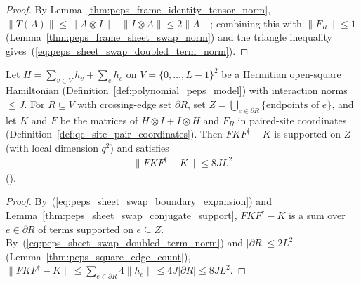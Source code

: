 \begin{proof}\leanok
    By Lemma~\ref{thm:peps_frame_identity_tensor_norm},
    $\|T(A)\|\le\|A\otimes I\|+\|I\otimes A\|\le 2\|A\|$; combining this with
    $\|F_R\|\le 1$ (Lemma~\ref{thm:peps_frame_sheet_swap_norm}) and the
    triangle inequality gives~(\ref{eq:peps_sheet_swap_doubled_term_norm}).
\end{proof}

\begin{lemma}
    \label{thm:peps_swapped_doubled_boundary_bound}
    \leanok
    Let $H=\sum_{v\in V}h_v+\sum_e h_e$ on $V=\{0,\ldots,L-1\}^2$ be a
    Hermitian open-square Hamiltonian (Definition~\ref{def:polynomial_peps_model})
    with interaction norms $\le J$. For $R\subseteq V$ with crossing-edge set
    $\partial R$, set $Z=\bigcup_{e\in\partial R}\{\text{endpoints of }e\}$,
    and let $K$ and $F$ be the matrices of $H\otimes I+I\otimes H$ and $F_R$ in
    paired-site coordinates (Definition~\ref{def:qc_site_pair_coordinates}).
    Then $FKF^\dagger-K$ is supported on $Z$ (with local dimension $q^2$) and
    satisfies
    \begin{align}
        \|FKF^\dagger-K\|\leq 8JL^2
        \label{eq:peps_swapped_doubled_boundary_bound}
    \end{align}
    (\cite{OpenAI2026PolynomialPEPS}).
\end{lemma}
\begin{proof}
    \leanok
    By~(\ref{eq:peps_sheet_swap_boundary_expansion}) and
    Lemma~\ref{thm:peps_sheet_swap_conjugate_support}, $FKF^\dagger-K$ is a
    sum over $e\in\partial R$ of terms supported on $e\subseteq Z$. By~(\ref{eq:peps_sheet_swap_doubled_term_norm})
    and $|\partial R|\le 2L^2$ (Lemma~\ref{thm:peps_square_edge_count}),
    $\|FKF^\dagger-K\|\le\sum_{e\in\partial R}4\|h_e\|\le 4J|\partial R|\le 8JL^2$.
\end{proof}

